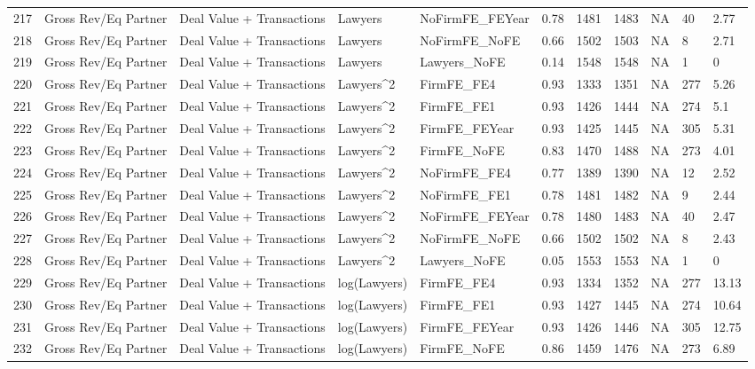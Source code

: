 \documentclass{article}
\begin{document}
\begin{table}[H]
\begin{tabular}{rllllllllll}
  217 & Gross Rev/Eq Partner & Deal Value + Transactions & Lawyers & NoFirmFE\_FEYear & 0.78 & 1481 & 1483 & NA & 40 & 2.77 \\
  218 & Gross Rev/Eq Partner & Deal Value + Transactions & Lawyers & NoFirmFE\_NoFE & 0.66 & 1502 & 1503 & NA & 8 & 2.71 \\
  219 & Gross Rev/Eq Partner & Deal Value + Transactions & Lawyers & Lawyers\_NoFE & 0.14 & 1548 & 1548 & NA & 1 & 0 \\
  220 & Gross Rev/Eq Partner & Deal Value + Transactions & Lawyers^2 & FirmFE\_FE4 & 0.93 & 1333 & 1351 & NA & 277 & 5.26 \\
  221 & Gross Rev/Eq Partner & Deal Value + Transactions & Lawyers^2 & FirmFE\_FE1 & 0.93 & 1426 & 1444 & NA & 274 & 5.1 \\
  222 & Gross Rev/Eq Partner & Deal Value + Transactions & Lawyers^2 & FirmFE\_FEYear & 0.93 & 1425 & 1445 & NA & 305 & 5.31 \\
  223 & Gross Rev/Eq Partner & Deal Value + Transactions & Lawyers^2 & FirmFE\_NoFE & 0.83 & 1470 & 1488 & NA & 273 & 4.01 \\
  224 & Gross Rev/Eq Partner & Deal Value + Transactions & Lawyers^2 & NoFirmFE\_FE4 & 0.77 & 1389 & 1390 & NA & 12 & 2.52 \\
  225 & Gross Rev/Eq Partner & Deal Value + Transactions & Lawyers^2 & NoFirmFE\_FE1 & 0.78 & 1481 & 1482 & NA & 9 & 2.44 \\
  226 & Gross Rev/Eq Partner & Deal Value + Transactions & Lawyers^2 & NoFirmFE\_FEYear & 0.78 & 1480 & 1483 & NA & 40 & 2.47 \\
  227 & Gross Rev/Eq Partner & Deal Value + Transactions & Lawyers^2 & NoFirmFE\_NoFE & 0.66 & 1502 & 1502 & NA & 8 & 2.43 \\
  228 & Gross Rev/Eq Partner & Deal Value + Transactions & Lawyers^2 & Lawyers\_NoFE & 0.05 & 1553 & 1553 & NA & 1 & 0 \\
  229 & Gross Rev/Eq Partner & Deal Value + Transactions & log(Lawyers) & FirmFE\_FE4 & 0.93 & 1334 & 1352 & NA & 277 & 13.13 \\
  230 & Gross Rev/Eq Partner & Deal Value + Transactions & log(Lawyers) & FirmFE\_FE1 & 0.93 & 1427 & 1445 & NA & 274 & 10.64 \\
  231 & Gross Rev/Eq Partner & Deal Value + Transactions & log(Lawyers) & FirmFE\_FEYear & 0.93 & 1426 & 1446 & NA & 305 & 12.75 \\
  232 & Gross Rev/Eq Partner & Deal Value + Transactions & log(Lawyers) & FirmFE\_NoFE & 0.86 & 1459 & 1476 & NA & 273 & 6.89 \\

\end{tabular}
\end{table}
\end{document}
